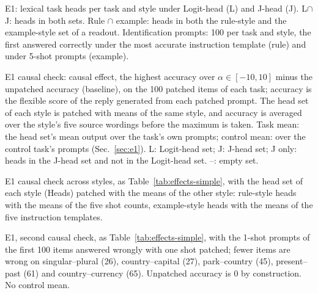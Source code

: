 \documentclass[11pt,a4paper]{article}
\begin{document}
\begin{table}[tbp]
\centering\footnotesize

\caption{E1: lexical task heads per task and style under Logit-head (L) and J-head (J). L$\cap$J: heads in both sets. Rule $\cap$ example: heads in both the rule-style and the example-style set of a readout. Identification prompts: 100 per task and style, the first answered correctly under the most accurate instruction template (rule) and under 5-shot prompts (example).}
\label{tab:heads-simple}
\end{table}

\begin{table}[tbp]
\centering\footnotesize

\caption{E1 causal check: causal effect, the highest accuracy over $\alpha\in[-10,10]$ minus the unpatched accuracy (baseline), on the 100 patched items of each task; accuracy is the flexible score of the reply generated from each patched prompt. The head set of each style is patched with means of the same style, and accuracy is averaged over the style's five source wordings before the maximum is taken. Task mean: the head set's mean output over the task's own prompts; control mean: over the control task's prompts (Sec.~\ref{sec:e1}). L: Logit-head set; J: J-head set; J only: heads in the J-head set and not in the Logit-head set. --: empty set.}
\label{tab:effects-simple}
\end{table}

\begin{table}[tbp]
\centering\footnotesize

\caption{E1 causal check across styles, as Table~\ref{tab:effects-simple}, with the head set of each style (Heads) patched with the means of the other style: rule-style heads with the means of the five shot counts, example-style heads with the means of the five instruction templates.}
\label{tab:effects-simple-cross}
\end{table}

\begin{table}[tbp]
\centering\footnotesize

\caption{E1, second causal check, as Table~\ref{tab:effects-simple}, with the 1-shot prompts of the first 100 items answered wrongly with one shot patched; fewer items are wrong on singular--plural (26), country--capital (27), park--country (45), present--past (61) and country--currency (65). Unpatched accuracy is 0 by construction. No control mean.}
\label{tab:effects-simple-wrong}
\end{table}
\end{document}
